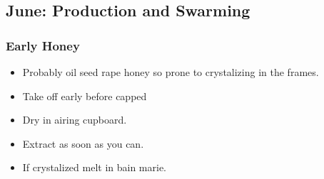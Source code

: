 \subsection{June: Production and Swarming}

\subsubsection{Early Honey}

\begin{itemize}
    \item Probably oil seed rape honey so prone to crystalizing in the frames.
    \item Take off early before capped
    \item Dry in airing cupboard.
    \item Extract as soon as you can.
    \item If crystalized melt in bain marie.
\end{itemize}




